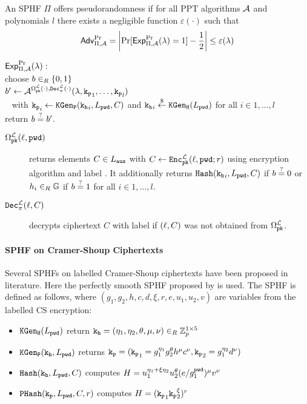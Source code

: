 \begin{definition}[Pseudorandomness]\label{def:prplusc}
An \ac{SPHF} $\Pi$ offers pseudorandomness if for all \ac{PPT} algorithms $\mathcal{A}$ and polynomials $l$ there exists a negligible function $\varepsilon(\cdot)$ such that
\[\mathsf{Adv}_{\Pi,\mathcal{A}}^{\Pr}=\left|\Pr[\mathsf{Exp}_{\Pi,\mathcal{A}}^{\Pr}(\lambda)=1] - \frac12 \right|\leq \varepsilon(\lambda)\]

\noindent
$\mathsf{Exp}_{\Pi,\mathcal{A}}^{\Pr}(\lambda):$ \\
\hspace*{2em} choose $b\in_R\{0,1\}$\\
\hspace*{2em} $b'\gets\mathcal{A}^{\Omega^{\mathcal{L}}_\mathtt{pk}(\cdot),\mathtt{Dec}^\mathcal{L}_\pi(\cdot)}(\lambda,\mathtt{k_p}_1,\dots,\mathtt{k_p}_l)$ \\
\hspace*{4em}~ with $\mathtt{k_p}_i\gets\mathtt{KGen_P}(\mathtt{k_h}_i,L_\mathtt{pwd},C)$ and $\mathtt{k_h}_i\stackrel{\$}{\gets}\mathtt{KGen_H}(L_\mathtt{pwd})$ for all $i\in 1,\dots,l$ \\
\hspace*{2em} return $b\stackrel{?}{=} b'$.

\begin{description}
	\item[$\Omega^{\mathcal{L}}_\mathtt{pk}(\ell,\mathtt{pwd})$] returns elements $C\in L_\mathtt{aux}$ with $C\gets\mathtt{Enc}^\mathcal{L}_\mathtt{pk}(\ell,\allowbreak\mathtt{pwd};r)$ using encryption algorithm \cL and label \Label.
    	It additionally returns $\mathtt{Hash}(\mathtt{k_h}_{i},L_\mathtt{pwd},C)$ if $b\stackrel{?}{=} 0$ or $h_{i}\in_R\mathbb{G}$ if $b\stackrel{?}{=} 1$ for all $i\in 1,\dots, l$.
	
	\item[$\mathtt{Dec}^\mathcal{L}_\pi(\ell,C)$] decrypts ciphertext $C$ with label \Label if $(\ell,C)$ was not obtained from $\Omega^\mathcal{L}_\mathtt{pk}$. \eod
\end{description}
\end{definition}

\paragraph{SPHF on Cramer-Shoup Ciphertexts}
Several \acp{SPHF} on labelled Cramer-Shoup ciphertexts have been proposed in literature.
Here the perfectly smooth \ac{SPHF} proposed by \citet{Benhamouda2013} is used.
The \ac{SPHF} is defined as follows, where $(g_1,g_2,h,c,d,\xi,r,e,u_1,u_2,v)$ are variables from the labelled \ac{CS} encryption:
\begin{itemize}
  \item $\mathtt{KGen_H}(L_\mathtt{pwd})$ return $\mathtt{k_h}=(\eta_1,\eta_2,\theta,\mu,\nu)\in_R\mathbb{Z}_p^{1\times 5}$
  \item $\mathtt{KGen_P}(\mathtt{k_h}, L_\mathtt{pwd})$ returns $\mathtt{k_p}=(\mathtt{k_p}_1=g_1^{\eta_1} g_2^{\theta} h^\mu c^\nu, \mathtt{k_p}_2=g_1^{\eta_2} d^{\nu})$
  \item $\mathtt{Hash}(\mathtt{k_h}, L_\mathtt{pwd}, C)$ computes $H=u_1^{\eta_1+\xi\eta_2} u_2^{\theta} (e/g_1^{\mathtt{pwd}})^\mu v^\nu$
  \item $\mathtt{PHash}(\mathtt{k_p}, L_\mathtt{pwd}, C, r)$ computes $H=(\mathtt{k_p}_1 \mathtt{k_p}_2^\xi)^r$
\end{itemize}

